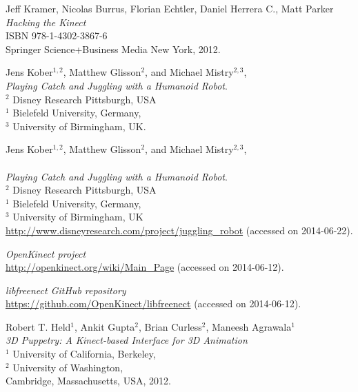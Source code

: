 \documentclass[12pt,a4paper,ngerman]{scrartcl}
\begin{document}
\newpage
{}
{}
\renewcommand{\refname}{Quellen}

\begin{thebibliography}{99}

Jeff Kramer, Nicolas Burrus, Florian Echtler, Daniel Herrera C., Matt Parker\\
{\em Hacking the Kinect}\\
ISBN 978-1-4302-3867-6\\
Springer Science+Business Media New York, 2012.

Jens Kober$^{1,2}$, Matthew Glisson$^{2}$, and Michael Mistry$^{2,3}$,\\
{\em Playing Catch and Juggling with a Humanoid Robot}.\\
$^{2}$ Disney Research Pittsburgh, USA\\
$^{1}$ Bielefeld University, Germany,\\
$^{3}$ University of Birmingham, UK.

Jens Kober$^{1,2}$, Matthew Glisson$^{2}$, and Michael Mistry$^{2,3}$,\\
\\
{\em Playing Catch and Juggling with a Humanoid Robot}.\\
$^{2}$ Disney Research Pittsburgh, USA\\
$^{1}$ Bielefeld University, Germany,\\
$^{3}$ University of Birmingham, UK\\
\url{http://www.disneyresearch.com/project/juggling_robot} (accessed on 2014-06-22).

{\em OpenKinect project}\\
\url{http://openkinect.org/wiki/Main_Page} (accessed on 2014-06-12).

{\em libfreenect GitHub repository}\\
\url{https://github.com/OpenKinect/libfreenect} (accessed on 2014-06-12).

Robert T. Held$^{1}$, Ankit Gupta$^{2}$, Brian Curless$^{2}$, Maneesh Agrawala$^{1}$\\
{\em 3D Puppetry: A Kinect-based Interface for 3D Animation}\\
$^{1}$ University of California, Berkeley,\\
$^{2}$ University of Washington,\\
Cambridge, Massachusetts, USA, 2012.


\end{thebibliography}
\end{document}

